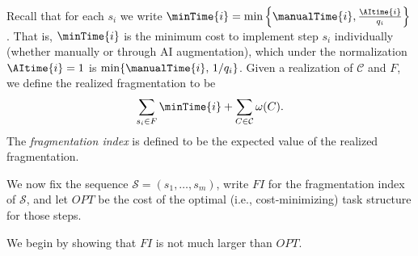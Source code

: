 Recall that for each $s_i$ we write $\minTime{i} = \min\left\{\manualTime{i}, \frac{\AItime{i}}{q_i}\right\}$.
That is, $\minTime{i}$ is the minimum cost to implement step $s_i$ individually (whether manually or through AI augmentation), which under the normalization $\AItime{i} = 1$ is $\min\{\manualTime{i},\, 1/q_i\}$.
Given a realization of $\mathcal{C}$ and $F$, we define the realized fragmentation to be
\[ \sum_{s_i \in F}\minTime{i} + \sum_{C \in \mathcal{C}} \omega(C).\]
The \emph{fragmentation index} is defined to be the expected value of the realized fragmentation.

We now fix the sequence $\mathcal{S} = (s_1, \dotsc, s_m)$, write $FI$ for the fragmentation index of $\mathcal{S}$, and let $OPT$ be the cost of the optimal (i.e., cost-minimizing) task structure for those steps.

We begin by showing that $FI$ is not much larger than $OPT$.

